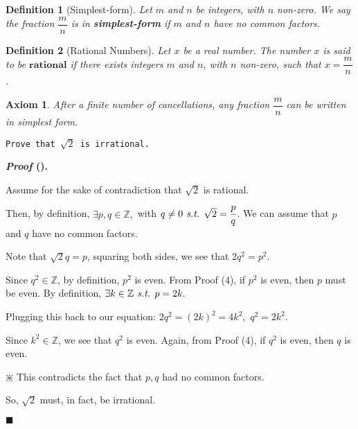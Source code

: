 \documentclass[12pt,a4paper]{article}
\newtheorem{ax}{Axiom}[section]
\newtheorem{df}{Definition}[subsection]
\newcounter{nprf}[subsection]
\newenvironment*{prf}{\par\indent\textbf{\textit{Proof} (\stepcounter{nprf}\thenprf). }\par}{\par\hfill $\blacksquare$\par}
\def\Z{{\mathbb{Z}}}
\def\st{\emph{ s.t. }}
\begin{document}
\begin{df}[Simplest-form]
	Let $m$ and $n$ be integers, with $n$ non-zero. We say the fraction $\dfrac{m}{n}$ is in \textbf{simplest-form} if $m$ and $n$ have no common factors.	
\end{df}
\begin{df}[Rational Numbers]
	Let $x$ be a real number. The number $x$ is said to be $\textbf{rational}$ if there exists integers $m$ and $n$, with $n$ non-zero, such that $x=\dfrac{m}{n}$.	
\end{df}
\begin{ax}
	After a finite number of cancellations, any	fraction $\dfrac{m}{n}$ can be written in simplest form. 
\end{ax}
\begin{framed}
\noindent\texttt{Prove that $\sqrt{2}$ is irrational.}
\begin{prf}
	Assume for the sake of contradiction that $\sqrt{2}$ is rational. \par Then, by definition, $\exists p,q\in\Z,$ with $q\neq0\st\sqrt{2}=\dfrac{p}{q}$. We can assume that $p$ and $q$ have no common factors. \par Note that $\sqrt{2}q=p$, squaring both sides, we see that $2q^2=p^2$.\par Since $q^2\in\Z$, by definition, $p^2$ is even. From Proof (4), if $p^2$ is even, then $p$ must be even. By definition, $\exists k\in\Z\st p=2k.$\par Plugging this back to our equation: $2q^2=(2k)^2=4k^2,$ $q^2=2k^2$.\par Since $k^2\in\Z$, we see that $q^2$ is even. Again, from Proof (4), if $q^2$ is even, then $q$ is even. \par \begin{center}$\divideontimes$ This contradicts the fact that $p,q$ had no common factors.\end{center}\par So, $\sqrt{2}$ must, in fact, be irrational. 
\end{prf}	
\end{framed}
\end{document}
